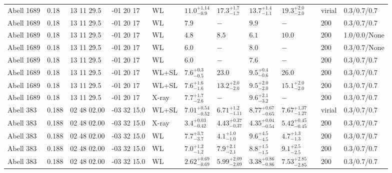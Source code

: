 \begin{landscape}
\begin{center}
{\begin{longtable}{llllllllllll}
Abell 1689 & 0.18 & 13 11 29.5 & -01 20 17 & WL & ${11.0}^{+1.14}_{-0.9}$ & ${17.3}^{+1.7}_{-1.7}$ & ${13.7}^{+1.4}_{-1.1}$ & ${19.3}^{+2.0}_{-2.0}$ & \citet{BR05.1} & virial & 0.3/0.7/0.7 \\
Abell 1689 & 0.18 & 13 11 29.5 & -01 20 17 & WL & ${7.9}^{}_{}$ & ${-}^{}_{}$ & ${9.9}^{}_{}$ & ${-}^{}_{}$ & \citet{CL03.1} & 200 & 0.3/0.7/0.7 \\
Abell 1689 & 0.18 & 13 11 29.5 & -01 20 17 & WL & ${4.8}^{}_{}$ & ${8.5}^{}_{}$ & ${6.1}^{}_{}$ & ${10.0}^{}_{}$ & \citet{KI02.1} & 200 & 1.0/0.0/None \\
Abell 1689 & 0.18 & 13 11 29.5 & -01 20 17 & WL & ${6.0}^{}_{}$ & ${-}^{}_{}$ & ${8.0}^{}_{}$ & ${-}^{}_{}$ & \citet{CL01.2} & 200 & 0.3/0.7/None \\
Abell 1689 & 0.18 & 13 11 29.5 & -01 20 17 & WL & ${6.0}^{}_{}$ & ${-}^{}_{}$ & ${7.6}^{}_{}$ & ${-}^{}_{}$ & \citet{CL01.1} & 200 & 0.3/0.7/0.7 \\
Abell 1689 & 0.18 & 13 11 29.5 & -01 20 17 & WL+SL & ${7.6}^{+0.3}_{-0.5}$ & ${23.0}^{}_{}$ & ${9.5}^{+0.4}_{-0.6}$ & ${26.0}^{}_{}$ & \citet{HA06.1} & 200 & 0.3/0.7/0.7 \\
Abell 1689 & 0.18 & 13 11 29.5 & -01 20 17 & WL+SL & ${7.6}^{+1.6}_{-1.6}$ & ${13.2}^{+2.0}_{-2.0}$ & ${9.5}^{+2.0}_{-2.0}$ & ${15.1}^{+2.0}_{-2.0}$ & \citet{LI07.1} & 200 & 0.3/0.7/0.7 \\
Abell 1689 & 0.18 & 13 11 29.5 & -01 20 17 & X-ray & ${7.7}^{+1.7}_{-2.6}$ & ${-}^{}_{}$ & ${9.6}^{+2.1}_{-3.2}$ & ${-}^{}_{}$ & \citet{AN04.1} & 200 & 0.3/0.7/0.7 \\
Abell 383 & 0.188 & 02 48 02.00 & -03 32 15.0 & WL+SL & ${7.01}^{+0.54}_{-0.52}$ & ${6.71}^{+1.2}_{-1.11}$ & ${8.77}^{+0.67}_{-0.65}$ & ${7.67}^{+1.37}_{-1.27}$ & \citet{ZI11.1} & virial & 0.3/0.7/0.7 \\
Abell 383 & 0.188 & 02 48 02.00 & -03 32 15.0 & X-ray & ${3.4}^{+0.03}_{-0.42}$ & ${4.43}^{+0.37}_{-0.37}$ & ${4.35}^{+0.04}_{-0.54}$ & ${5.42}^{+0.45}_{-0.45}$ & \citet{ET11.1} & 200 & 0.3/0.7/0.7 \\
Abell 383 & 0.188 & 02 48 02.00 & -03 32 15.0 & WL & ${7.7}^{+3.7}_{-3.7}$ & ${4.1}^{+1.0}_{-1.0}$ & ${9.6}^{+4.5}_{-4.5}$ & ${4.7}^{+1.3}_{-1.3}$ & \citet{SE14.1} & 200 & 0.3/0.7/0.7 \\
Abell 383 & 0.188 & 02 48 02.00 & -03 32 15.0 & WL & ${7.0}^{+1.2}_{-1.2}$ & ${7.9}^{+2.1}_{-2.1}$ & ${8.8}^{+1.5}_{-1.5}$ & ${9.1}^{+2.5}_{-2.5}$ & \citet{SE14.1} & 200 & 0.3/0.7/0.7 \\
Abell 383 & 0.188 & 02 48 02.00 & -03 32 15.0 & WL & ${2.62}^{+0.69}_{-0.69}$ & ${5.99}^{+2.09}_{-2.09}$ & ${3.38}^{+0.86}_{-0.86}$ & ${7.53}^{+2.85}_{-2.85}$ & \citet{BA07.1} & 200 & 0.3/0.7/0.7 \\

\end{longtable}}
\end{center}
\end{landscape}
